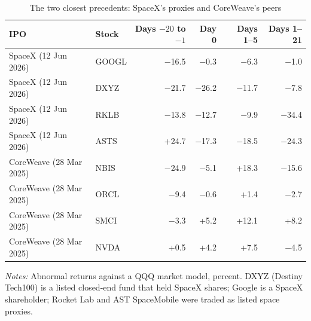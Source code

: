 \begin{table}[!htbp]\centering\footnotesize
\caption{The two closest precedents: SpaceX's proxies and CoreWeave's peers}\label{tab:b8}

\begin{threeparttable}
\begin{tabular}{llrrrr}
\toprule
IPO & Stock & Days $-20$ to $-1$ & Day 0 & Days 1--5 & Days 1--21 \\
\midrule
SpaceX (12 Jun 2026) & GOOGL & $-$16.5 & $-$0.3 & $-$6.3 & $-$1.0 \\
SpaceX (12 Jun 2026) & DXYZ & $-$21.7 & $-$26.2 & $-$11.7 & $-$7.8 \\
SpaceX (12 Jun 2026) & RKLB & $-$13.8 & $-$12.7 & $-$9.9 & $-$34.4 \\
SpaceX (12 Jun 2026) & ASTS & +24.7 & $-$17.3 & $-$18.5 & $-$24.3 \\
\midrule
CoreWeave (28 Mar 2025) & NBIS & $-$24.9 & $-$5.1 & +18.3 & $-$15.6 \\
CoreWeave (28 Mar 2025) & ORCL & $-$9.4 & $-$0.6 & +1.4 & $-$2.7 \\
CoreWeave (28 Mar 2025) & SMCI & $-$3.3 & +5.2 & +12.1 & +8.2 \\
CoreWeave (28 Mar 2025) & NVDA & +0.5 & +4.2 & +7.5 & $-$4.5 \\
\bottomrule
\end{tabular}
\begin{tablenotes}[flushleft]\footnotesize
\item \textit{Notes:} Abnormal returns against a QQQ market model, percent. DXYZ (Destiny Tech100) is a listed closed-end fund that held SpaceX shares; Google is a SpaceX shareholder; Rocket Lab and AST SpaceMobile were traded as listed space proxies.
\end{tablenotes}
\end{threeparttable}

\end{table}
